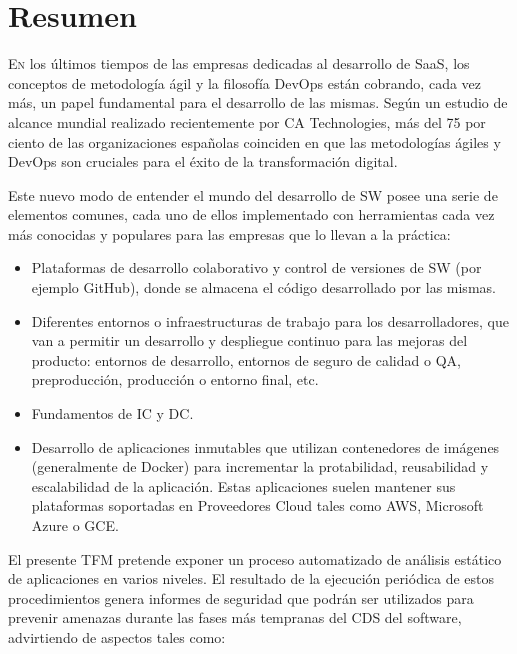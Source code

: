 \chapter*{Resumen}
\pagestyle{especial}
{}

\lettrine[lraise=-0.1, lines=2, loversize=0.2]{E}{n} los últimos tiempos de las empresas dedicadas al desarrollo de \gls{SaaS}, los conceptos de metodología ágil y la filosofía \gls{DevOps} están cobrando, cada vez más, un papel fundamental para el desarrollo de las mismas\cite{consultorit2017}. Según un estudio de alcance mundial realizado recientemente por CA Technologies, más del 75 por ciento de las organizaciones españolas coinciden en que las metodologías ágiles y \gls{DevOps} son cruciales para el éxito de la transformación digital\cite{catechnologies2017}.

Este nuevo modo de entender el mundo del desarrollo de \gls{SW} posee una serie de elementos comunes, cada uno de ellos implementado con herramientas cada vez más conocidas y populares para las empresas que lo llevan a la práctica: 

\begin{itemize}
	\item Plataformas de desarrollo colaborativo y control de versiones de \gls{SW} (por ejemplo GitHub\cite{github2017}), donde se almacena el código desarrollado por las mismas.
	\item Diferentes entornos o infraestructuras de trabajo para los desarrolladores, que van a permitir un desarrollo y despliegue continuo para las mejoras del producto: entornos de desarrollo, entornos de seguro de calidad o \gls{QA}, preproducción, producción o entorno final, etc.
	\item Fundamentos de \gls{IC} y \gls{DC}.
	\item Desarrollo de aplicaciones inmutables que utilizan contenedores de imágenes (generalmente de Docker\cite{docker2017}) para incrementar la protabilidad, reusabilidad y escalabilidad de la aplicación. Estas aplicaciones suelen mantener sus plataformas soportadas en Proveedores Cloud tales como \gls{AWS}\cite{aws2017}, Microsoft Azure\cite{azure2017} o \gls{GCE}\cite{google2017}.
\end{itemize}

El presente \gls{TFM} pretende exponer un proceso automatizado de análisis estático de aplicaciones en varios niveles. El resultado de la ejecución periódica de estos procedimientos genera informes de seguridad que podrán ser utilizados para prevenir amenazas durante las fases más tempranas del \gls{CDS} del software, advirtiendo de aspectos tales como:

